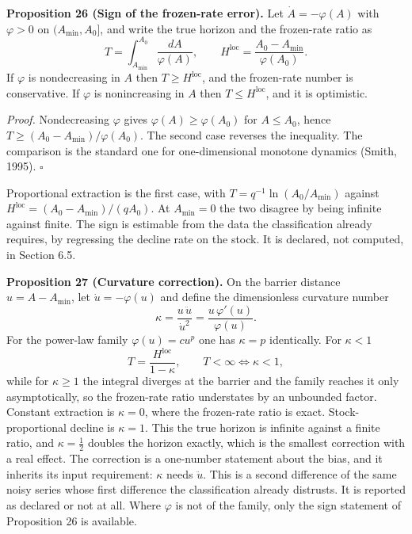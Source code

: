 \documentclass[11pt]{article}
\begin{document}
\textbf{Proposition 26 (Sign of the frozen-rate error).} Let \(\dot A=-\varphi(A)\) with \(\varphi>0\) on
\((A_{\min},A_0]\), and write the true horizon and the frozen-rate ratio as
\[ T=\int_{A_{\min}}^{A_0}\frac{dA}{\varphi(A)}, \qquad H^{\mathrm{loc}}=\frac{A_0-A_{\min}}{\varphi(A_0)} . \]
If \(\varphi\) is nondecreasing in \(A\) then \(T\ge H^{\mathrm{loc}}\), and the frozen-rate number
is conservative. If \(\varphi\) is nonincreasing in \(A\) then \(T\le H^{\mathrm{loc}}\), and it is
optimistic.

\emph{Proof.} Nondecreasing \(\varphi\) gives \(\varphi(A)\ge\varphi(A_0)\) for \(A\le A_0\), hence \(T\ge(A_0-A_{\min})/\varphi(A_0)\). The second case reverses the inequality. The comparison is the standard one for one-dimensional monotone dynamics (Smith, 1995). \ensuremath{\square}

Proportional extraction is the first case, with \(T=q^{-1}\ln(A_0/\allowbreak{}A_{\min})\) against \(H^{\mathrm{loc}}=(A_0-A_{\min})/(qA_0)\). At \(A_{\min}=0\) the two disagree by being infinite against finite. The sign is estimable from the data the classification already requires, by regressing the decline rate on the stock. It is declared, not computed, in Section 6.5.

\textbf{Proposition 27 (Curvature correction).} On the barrier distance \(u=A-A_{\min}\), let \(\dot u=-\varphi(u)\) and define the dimensionless curvature number \[ \kappa=\frac{u\,\ddot u}{\dot u^{2}}=\frac{u\,\varphi'(u)}{\varphi(u)} . \] For the power-law family \(\varphi(u)=cu^{p}\) one has \(\kappa=p\) identically. For \(\kappa<1\) \[ T=\frac{H^{\mathrm{loc}}}{1-\kappa}, \qquad T<\infty\iff\kappa<1, \] while for \(\kappa\ge1\) the integral diverges at the barrier and the family reaches it only asymptotically, so the frozen-rate ratio understates by an unbounded factor. Constant extraction is \(\kappa=0\), where the frozen-rate ratio is exact. Stock-proportional decline is \(\kappa=1\). This the true horizon is infinite against a finite ratio, and \(\kappa=\tfrac12\) doubles the horizon exactly, which is the smallest correction with a real effect. The correction is a one-number statement about the bias, and it inherits its input requirement: \(\kappa\) needs \(\ddot u\). This is a second difference of the same noisy series whose first difference the classification already distrusts. It is reported as declared or not at all. Where \(\varphi\) is not of the family, only the sign statement of Proposition 26 is available.
\end{document}
